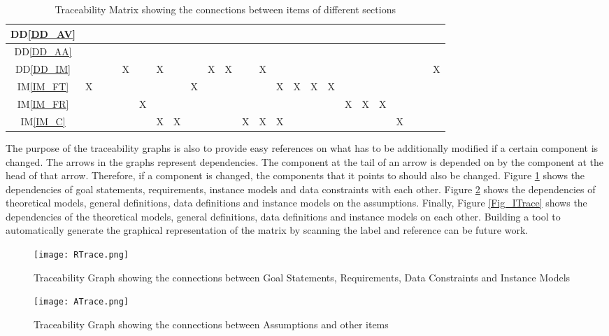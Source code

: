 \documentclass[12pt]{article}
\newcommand{\ddref}[1]{DD\ref{#1}}
\newcommand{\iref}[1]{IM\ref{#1}}
\begin{document}
\begin{landscape}
\begin{table}[h!]
\begin{tabular}{|c|c|c|c|c|c|c|c|c|c|c|c|c|c|c|c|c|c|c|c|c|c|c|c|}
 \ddref{DD_AV} 	& & & & & & & & & & & & & & & & & & & & & & &  \\ \hline
 \ddref{DD_AA} 	& & & & & & & & & & & & & & & & & & & & & & &  \\ \hline
 \ddref{DD_IM} 	& & & &X& &X& & &X&X& &X& & & & & & & & & & &X \\ \hline
 \iref{IM_FT} 	&X& & & & & & &X& & & & &X&X&X&X& & & & & & &  \\ \hline
 \iref{IM_FR} 	& & & & &X& & & & & & & & & & & &X&X&X& & & &  \\ \hline
 \iref{IM_C} 	& & & & & &X&X& & & &X&X&X& & & & & & &X& & &  \\ \hline
\end{tabular}
\bigskip
\caption{Traceability Matrix showing the connections between items of different sections} \label{ITraceMatrix}
\end{table}
\end{landscape}

\noindent
The purpose of the traceability graphs is also to provide easy references on what has to be additionally 
modified if a certain component is changed. The arrows in the graphs represent dependencies. The 
component at the tail of an arrow is depended on by the component at the head of that arrow. Therefore,
if a component is changed, the components that it points to should also be changed. Figure \ref{Fig_RTrace}
shows the dependencies of goal statements, requirements, instance models and data constraints with
each other. Figure \ref{Fig_ATrace} shows the dependencies of theoretical models, general definitions,
data definitions and instance models on the assumptions. Finally, Figure \ref{Fig_ITrace} shows the 
dependencies of the theoretical models, general definitions, data definitions and instance models 
on each other. Building a tool to automatically generate the graphical representation of the matrix
by scanning the label and reference can be future work. \\

\begin{figure}[h!]
	\begin{center}
		{
			\texttt{[image: RTrace.png]}
		}
		\bigskip
		\caption{Traceability Graph showing the connections between Goal Statements, 
Requirements, Data Constraints and Instance Models}
		\label{Fig_RTrace}
	\end{center}
\end{figure}

\begin{figure}[h!]
	\begin{center}
		{
		\texttt{[image: ATrace.png]}
		}
	\bigskip
	\caption{Traceability Graph showing the connections between Assumptions and other items}
	\label{Fig_ATrace}
	\end{center}
\end{figure}
\end{document}
